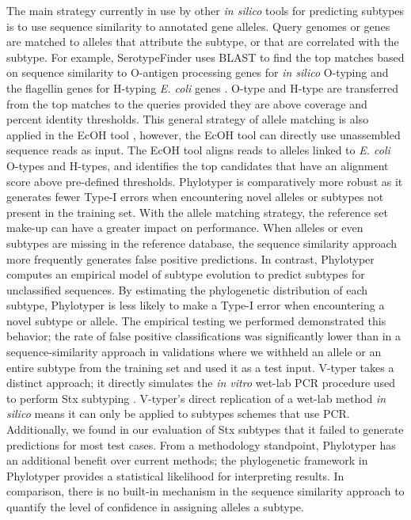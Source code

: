 \documentclass{bioinfo}
\begin{document}
The main strategy currently in use by other \textit{in silico} tools for predicting subtypes is to use sequence similarity to annotated gene alleles.
Query genomes or genes are matched to alleles that attribute the subtype, or that are correlated with the subtype.
For example, SerotypeFinder uses BLAST to find the top matches based on sequence similarity to O-antigen processing genes for \textit{in silico} O-typing and the flagellin genes for H-typing \textit{E. coli} genes \citep{Jenkins2015}.  
O-type and H-type are transferred from the top matches to the queries provided they are above coverage and percent identity thresholds.
This general strategy of allele matching is also applied in the EcOH tool \citep{Ingle2016}, however, the EcOH tool can directly use unassembled sequence reads as input. The EcOH tool aligns reads to alleles linked to \textit{E. coli} O-types and H-types, and identifies the top candidates that have an alignment score above pre-defined thresholds.
Phylotyper is comparatively more robust as it generates fewer Type-I errors when encountering novel alleles or subtypes not present in the training set.
With the allele matching strategy, the reference set make-up can have a greater impact on performance.
When alleles or even subtypes are missing in the reference database, the sequence similarity approach more frequently generates false positive predictions.
In contrast, Phylotyper computes an empirical model of subtype evolution to predict subtypes for unclassified sequences.
By estimating the phylogenetic distribution of each subtype, Phylotyper is less likely to make a Type-I error when encountering a novel subtype or allele. 
The empirical testing we performed demonstrated this behavior; 
the rate of false positive classifications was significantly lower than in a sequence-similarity approach in validations where we withheld an allele or an entire subtype from the training set and used it as a test input.
V-typer takes a distinct approach; it directly simulates the \textit{in vitro} wet-lab PCR procedure used to perform Stx subtyping \citep{CARRILLO2016}. 
V-typer's direct replication of a wet-lab method \textit{in silico} means it can only be applied to subtypes schemes that use PCR. 
Additionally, we found in our evaluation of Stx subtypes that it failed to generate predictions for most test cases.
From a methodology standpoint, Phylotyper has an additional benefit over current methods; the phylogenetic framework in Phylotyper provides a statistical likelihood for interpreting results.
In comparison, there is no built-in mechanism in the sequence similarity approach to quantify the level of confidence in assigning alleles a subtype.
\end{document}
